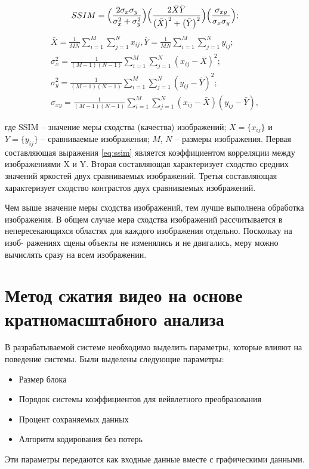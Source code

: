 \begin{equation}\label{eq:ssim}
SSIM= \Bigl(  \frac{2\sigma_{x}\sigma_{y}}{\sigma_{x}^{2}+\sigma_{y}^{2}} \Bigr) 
\Bigl( \frac{2\bar{X}\bar{Y}}{ \bigl( \bar{X} \bigr) ^{2} + \bigl( \bar{Y} \bigr) ^{2} } \Bigr)
\Bigl(  \frac{\sigma_{xy}}{\sigma_{x}\sigma_{y}} \Bigr); 
\end{equation}
\begin{equation}\label{eq:ssim1}
\begin{split}
\bar{X}=\frac{1}{MN}\sum_{i=1}^{M}\sum_{j=1}^{N}x_{ij},\bar{Y}=\frac{1}{MN}\sum_{i=1}^{M}\sum_{j=1}^{N}y_{ij}; \\
\sigma_{x}^2=\frac{1}{(M-1)(N-1)}\sum_{i=1}^{M}\sum_{j=1}^{N}(x_{ij}-\bar{X})^2; \\
\sigma_{y}^2=\frac{1}{(M-1)(N-1)}\sum_{i=1}^{M}\sum_{j=1}^{N}(y_{ij}-\bar{Y})^2; \\
\sigma_{xy}=\frac{1}{(M-1)(N-1)}\sum_{i=1}^{M}\sum_{j=1}^{N}(x_{ij}-\bar{X})(y_{ij}-\bar{Y}), 
\end{split}
\end{equation}

где SSIM – значение меры сходства (качества) изображений; $X=\{x_{ij}\}$ и $Y=\{y_{ij}\}$ – 
сравниваемые изображения; $M$, $N$ – размеры изображения. Первая составляющая 
выражения \ref{eq:ssim} является коэффициентом корреляции между изображениями X и Y. 
Вторая составляющая характеризует сходство средних значений яркостей двух сравниваемых изображений. 
Третья составляющая характеризует сходство контрастов 
двух сравниваемых изображений. 

Чем выше значение меры сходства изображений, тем лучше выполнена обработка изображения. 
В общем случае мера сходства изображений рассчитывается в 
непересекающихся областях для каждого изображения отдельно. Поскольку на изоб-
ражениях сцены объекты не изменялись и не двигались, меру можно вычислять сразу 
на всем изображении. 

\section{Метод сжатия видео на основе кратномасштабного анализа}

В разрабатываемой системе необходимо выделить параметры, которые влияют на поведение системы.
Были выделены следующие параметры:
\begin{itemize}
 \item Размер блока
 \item Порядок системы коэффициентов для вейвлетного преобразования
 \item Процент сохраняемых данных
 \item Алгоритм кодирования без потерь
\end{itemize}
Эти параметры передаются как входные данные вместе с графическими данными.

